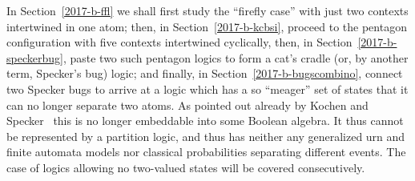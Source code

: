 In Section~\ref{2017-b-ffl} we shall first study the ``firefly case'' with just two contexts intertwined in one atom;
then, in Section~\ref{2017-b-kcbsi}, proceed to the pentagon configuration with five contexts intertwined cyclically,
then, in Section~\ref{2017-b-speckerbug}, paste two such pentagon logics to form a cat's cradle (or, by another term, Specker's bug) logic;
and finally, in Section~\ref{2017-b-bugscombino}, connect two Specker bugs to arrive at a logic which has a so ``meager''
set of states that it can no longer separate two atoms.
As pointed out already by Kochen and Specker~\cite[p.~70, Theorem~0]{kochen1} this is no longer embeddable into some Boolean algebra.
It thus cannot be represented by a partition logic, and thus has neither any generalized urn and finite automata models
nor classical probabilities separating different events.
The case of logics allowing no two-valued states will be covered consecutively.


